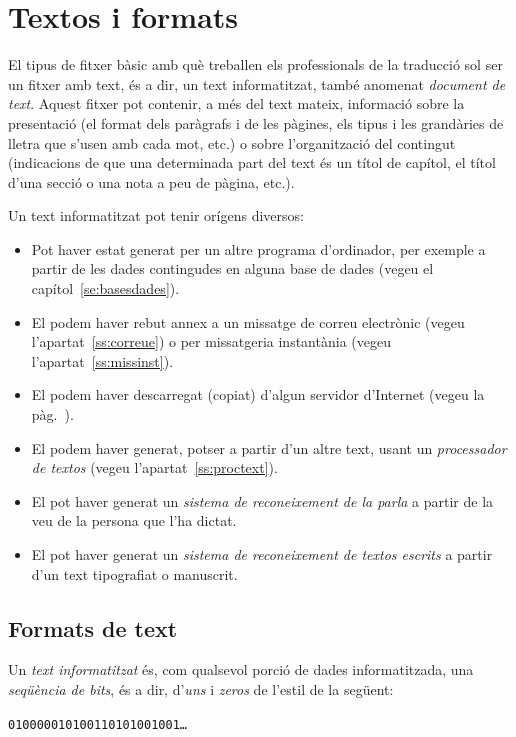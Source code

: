 \chapter{Textos i formats}
\label{se:EPT}

El tipus de fitxer bàsic amb què treballen els professionals de la
traducció sol ser un fitxer amb text, és a dir, un text informatitzat,
també anomenat \emph{document de text}. Aquest fitxer pot contenir, a
més del text mateix, informació sobre la presentació (el format dels
paràgrafs i de les pàgines, els tipus i les grandàries de lletra que
s'usen amb cada mot, etc.) o sobre l'organització del contingut
(indicacions de que una determinada part del text és un títol de
capítol, el títol d'una secció o una nota a peu de pàgina, etc.).

Un text informatitzat pot tenir orígens diversos:
\begin{itemize}
\item Pot haver estat generat per un altre programa d'ordinador, per
  exemple a partir de les dades contingudes en alguna base de dades
  (vegeu el capítol~\ref{se:basesdades}).
\item El podem haver rebut annex a un missatge de correu electrònic
  (vegeu l'apartat~\ref{ss:correue}) o per missatgeria instantània
  (vegeu l'apartat~\ref{ss:missinst}).
\item El podem haver descarregat (copiat) d'algun servidor d'Internet
  (vegeu la pàg.~\pageref{pg:ftp}).
\item El podem haver generat, potser a partir d'un altre
  text, usant un \emph{processador de textos} (vegeu
  l'apartat~\ref{ss:proctext}).
\item El pot haver generat un \emph{sistema de reconeixement de la
    parla} a partir de la veu de la persona que l'ha dictat.
\item El pot haver generat un \emph{sistema de reconeixement de textos
    escrits} a partir d'un text tipografiat o manuscrit.
\end{itemize}

\section{Formats de text} \label{ss:formats}
Un \emph{text informatitzat} és, com qualsevol porció de dades
informatitzada, una \emph{seqüència de bits}, és a dir, d'\emph{uns} i
\emph{zeros} de l'estil de la següent:
\begin{center}
 \texttt{010000010100110101001001\ldots}
\end{center}

